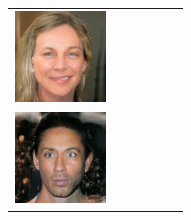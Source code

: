 \documentclass{article}
\newcommand{\pganw}{0.95in}
\begin{document}
\begin{table}[htbp]
\begin{center}
\begin{tabular}{cc|cc|cc}
\includegraphics[width=\pganw]{figures/pgan/59_base_iso_MH.jpg} \\
\includegraphics[width=\pganw]{figures/pgan/60_base_iso_base.jpg} &

\end{tabular}
\end{center}
\end{table}
\end{document}
